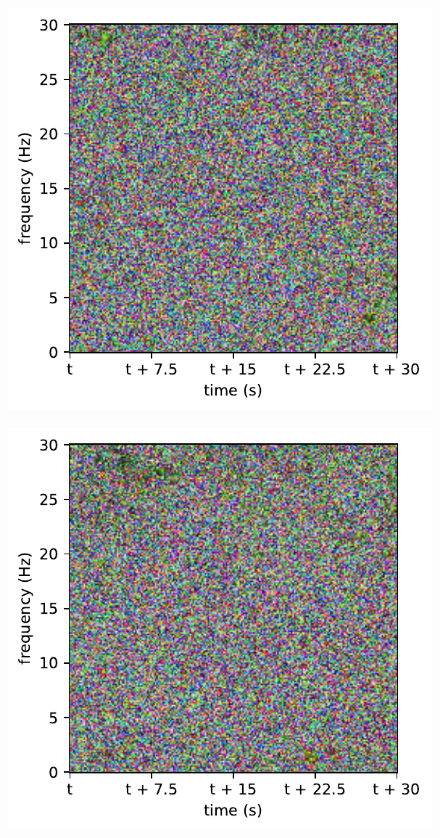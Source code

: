 \begin{subfigure}{.16\textwidth}
  \centering
  \includegraphics[width=1\linewidth]{./pics/class_rnn_2}
  \caption{}
  \label{fig_1_33}
\end{subfigure}%
\begin{subfigure}{.16\textwidth}
  \centering
  \includegraphics[width=1\linewidth]{./pics/class_rnn_3}
  \caption{}
  \label{fig_1_34}
\end{subfigure}%
